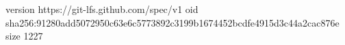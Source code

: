 version https://git-lfs.github.com/spec/v1
oid sha256:91280add5072950c63e6c5773892c3199b1674452bcdfe4915d3c44a2cac876e
size 1227
